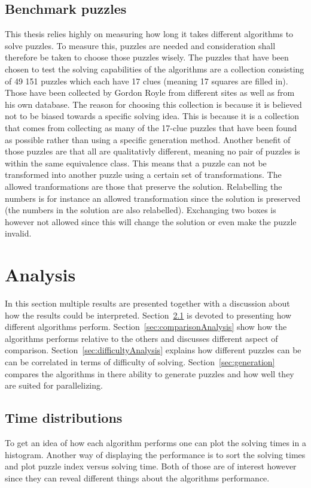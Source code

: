 \documentclass[a4paper,11pt]{kth-mag}
\begin{document}
\FloatBarrier
\section{Benchmark puzzles}
This thesis relies highly on measuring how long it takes different algorithms to solve puzzles. 
To measure this, puzzles are needed and consideration shall therefore be taken to choose those puzzles wisely.
The puzzles that have been chosen to test the solving capabilities of the algorithms are a collection consisting of 49 151 puzzles which each have 17 clues (meaning 17 squares are filled in). \cite{database} Those have been collected by Gordon Royle from different sites as well as from his own database.
The reason for choosing this collection is because it is believed not to be biased towards a specific solving idea.
This is because it is a collection that comes from collecting as many of the 17-clue puzzles that have been found as possible rather than using a specific generation method.
Another benefit of those puzzles are that all are qualitativly different, meaning no pair of puzzles is within the same equivalence class.
This means that a puzzle can not be transformed into another puzzle using a certain set of transformations.
The allowed tranformations are those that preserve the solution. Relabelling the numbers is for instance an allowed transformation since the solution is preserved (the numbers in the solution are also relabelled).
Exchanging two boxes is however not allowed since this will change the solution or even make the puzzle invalid.

\chapter{Analysis}
In this section multiple results are presented together with a discussion about how the results could be interpreted. 
Section~\ref{sec:timeDistributions} is devoted to presenting how different algorithms perform. 
Section~\ref{sec:comparisonAnalysis} show how the algorithms performs relative to the others and discusses different aspect of comparison.
Section~\ref{sec:difficultyAnalysis} explains how different puzzles can be can be correlated in terms of difficulty of solving.
Section~\ref{sec:generation} compares the algorithms in there ability to generate puzzles and how well they are suited for parallelizing.

\FloatBarrier
\section{Time distributions}
\label{sec:timeDistributions}
To get an idea of how each algorithm performs one can plot the solving times in a histogram. 
Another way of displaying the performance is to sort the solving times and plot puzzle index versus solving time. 
Both of those are of interest however since they can reveal different things about the algorithms performance. 
\end{document}
